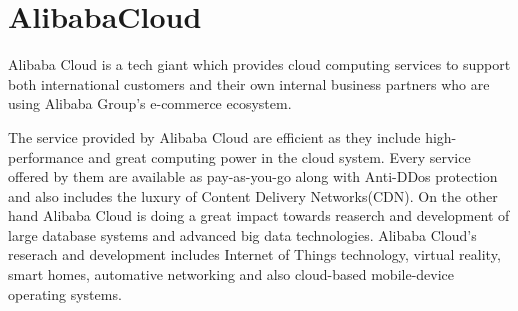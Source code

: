 \section{AlibabaCloud}

Alibaba Cloud is a tech giant which provides cloud computing services to support
both international customers and their own internal business partners who are
using Alibaba Group's e-commerce ecosystem.


The service provided by Alibaba Cloud are efficient as they include
high-performance and great computing power in the cloud system. Every service
offered by them are available as pay-as-you-go along with Anti-DDos protection
and also includes the luxury of Content Delivery Networks(CDN). On the other
hand Alibaba Cloud is doing a great impact towards reaserch and development of
large database systems and advanced big data technologies. Alibaba Cloud's
reserach and development includes Internet of Things technology, virtual
reality, smart homes, automative networking and also cloud-based mobile-device
operating systems. \cite{AlibabaCloud}

